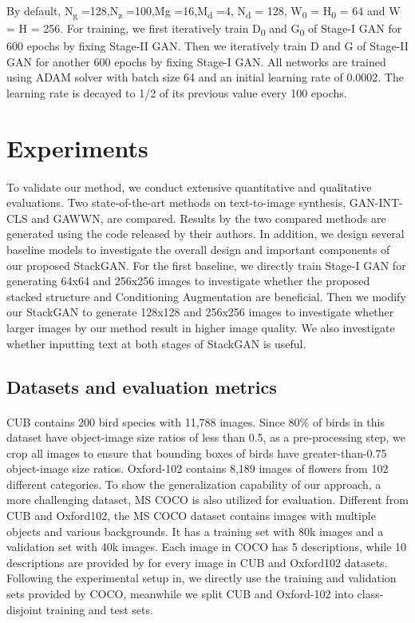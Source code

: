 \documentclass[a4paper,12pt,oneside]{article}
\begin{document}
By default, N\textsubscript{g} =128,N\textsubscript{z} =100,Mg =16,M\textsubscript{d} =4, N\textsubscript{d} = 128, W\textsubscript{0} = H\textsubscript{0} = 64 and W = H = 256. For training, we first iteratively train D\textsubscript{0} and G\textsubscript{0} of Stage-I GAN for 600 epochs by fixing Stage-II GAN. Then we iteratively train D and G of Stage-II GAN for another 600 epochs by fixing Stage-I GAN. All networks are trained using ADAM solver with batch size 64 and an initial learning rate of 0.0002. The learning rate is decayed to 1/2 of its previous value every 100 epochs. 

\newpage
\section{Experiments}
\paragraph{}
To validate our method, we conduct extensive quantitative and qualitative evaluations. Two state-of-the-art methods on text-to-image synthesis, GAN-INT-CLS and GAWWN, are compared. Results by the two compared methods are generated using the code released by their authors. In addition, we design several baseline models to investigate the overall design and important components of our proposed StackGAN. For the first baseline, we directly train Stage-I GAN for generating 64x64 and 256x256 images to investigate whether the proposed stacked structure and Conditioning Augmentation are beneficial. Then we modify our StackGAN to generate 128x128 and 256x256 images to investigate whether larger images by our method result in higher image quality. We also investigate whether inputting text at both stages of StackGAN is useful. 

\subsection{Datasets and evaluation metrics }
\paragraph{}

CUB contains 200 bird species with 11,788 images. Since 80\% of birds in this dataset have object-image size ratios of less than 0.5, as a pre-processing step, we crop all images to ensure that bounding boxes of birds have greater-than-0.75 object-image size ratios. Oxford-102 contains 8,189 images of flowers from 102 different categories. To show the generalization capability of our approach, a more challenging dataset, MS COCO is also utilized for evaluation. Different from CUB and Oxford102, the MS COCO dataset contains images with multiple objects and various backgrounds. It has a training set with 80k images and a validation set with 40k images. Each image in COCO has 5 descriptions, while 10 descriptions are provided by for every image in CUB and Oxford102 datasets. Following the experimental setup in, we directly use the training and validation sets provided by COCO, meanwhile we split CUB and Oxford-102 into class-disjoint training and test sets. 
\end{document}
